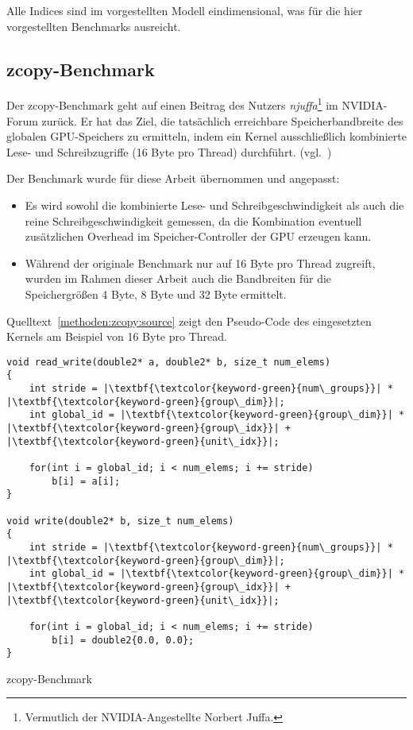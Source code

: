 Alle Indices sind im vorgestellten Modell eindimensional, was für die hier
vorgestellten Benchmarks ausreicht.

\subsection{zcopy-Benchmark}
\label{methoden:zcopy}

Der zcopy-Benchmark geht auf einen Beitrag des Nutzers \textit{njuffa}\footnote{
Vermutlich der NVIDIA-Angestellte Norbert Juffa.} im NVIDIA-Forum zurück. Er
hat das Ziel, die tatsächlich erreichbare Speicherbandbreite des globalen
GPU-Speichers zu ermitteln, indem ein Kernel ausschließlich kombinierte Lese-
und Schreibzugriffe (16 Byte pro Thread) durchführt. (vgl.~\cite{njuffa2017})

Der Benchmark wurde für diese Arbeit übernommen und angepasst:

\begin{itemize}
    \item Es wird sowohl die kombinierte Lese- und Schreibgeschwindigkeit als
          auch die reine Schreibgeschwindigkeit gemessen, da die Kombination
          eventuell zusätzlichen Overhead im Speicher-Controller der GPU
          erzeugen kann.
    \item Während der originale Benchmark nur auf 16 Byte pro Thread zugreift,
          wurden im Rahmen dieser Arbeit auch die Bandbreiten für die
          Speichergrößen 4 Byte, 8 Byte und 32 Byte ermittelt.
\end{itemize}

Quelltext~\ref{methoden:zcopy:source} zeigt den Pseudo-Code des eingesetzten
Kernels am Beispiel von 16 Byte pro Thread.

\begin{code}
    \begin{verbatim}
void read_write(double2* a, double2* b, size_t num_elems)
{
    int stride = |\textbf{\textcolor{keyword-green}{num\_groups}}| * |\textbf{\textcolor{keyword-green}{group\_dim}}|;
    int global_id = |\textbf{\textcolor{keyword-green}{group\_dim}}| * |\textbf{\textcolor{keyword-green}{group\_idx}}| + |\textbf{\textcolor{keyword-green}{unit\_idx}}|;

    for(int i = global_id; i < num_elems; i += stride)
        b[i] = a[i];
}

void write(double2* b, size_t num_elems)
{
    int stride = |\textbf{\textcolor{keyword-green}{num\_groups}}| * |\textbf{\textcolor{keyword-green}{group\_dim}}|;
    int global_id = |\textbf{\textcolor{keyword-green}{group\_dim}}| * |\textbf{\textcolor{keyword-green}{group\_idx}}| + |\textbf{\textcolor{keyword-green}{unit\_idx}}|;

    for(int i = global_id; i < num_elems; i += stride)
        b[i] = double2{0.0, 0.0};
}
    \end{verbatim}
    \caption{zcopy-Benchmark}
    \label{methoden:zcopy:source}
\end{code}

